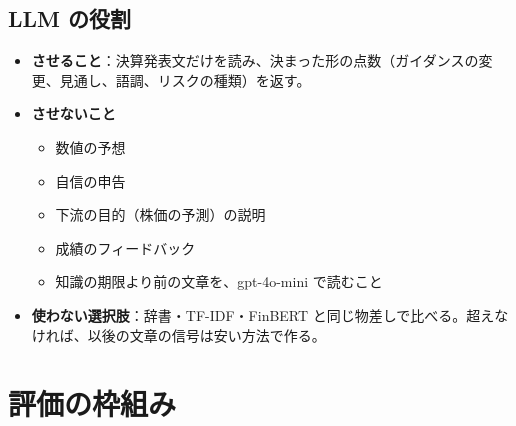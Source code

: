 \documentclass[xelatex,ja=standard,jafont=haranoaji,a4paper,10pt]{bxjsarticle}
\begin{document}
\subsection*{LLM の役割}
\begin{itemize}
\item \textbf{させること}：決算発表文だけを読み、決まった形の点数（ガイダンスの変更、見通し、語調、リスクの種類）を返す。
\item \textbf{させないこと}
  \begin{itemize}
  \item 数値の予想
  \item 自信の申告
  \item 下流の目的（株価の予測）の説明
  \item 成績のフィードバック
  \item 知識の期限より前の文章を、gpt-4o-mini で読むこと
  \end{itemize}
\item \textbf{使わない選択肢}：辞書・TF-IDF・FinBERT と同じ物差しで比べる。超えなければ、以後の文章の信号は安い方法で作る。
\end{itemize}

\section{評価の枠組み}
\end{document}
